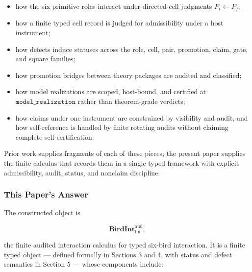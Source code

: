 \documentclass[11pt]{article}
\providecommand{\tightlist}{}
\theoremstyle{definition}
\begin{document}
\begin{itemize}
\tightlist
\item
  how the six primitive roles interact under directed-cell judgments \(P_{i}\leftarrow P_{j}\);
\item
  how a finite typed cell record is judged for admissibility under a host instrument;
\item
  how defects induce statuses across the role, cell, pair, promotion, claim, gate, and square families;
\item
  how promotion bridges between theory packages are audited and classified;
\item
  how model realizations are scoped, host-bound, and certified at \(\texttt{model\_realization}\) rather than theorem-grade verdicts;
\item
  how claims under one instrument are constrained by visibility and audit, and how self-reference is handled by finite rotating audits without claiming complete self-certification.
\end{itemize}

Prior work supplies fragments of each of these pieces; the present paper supplies the finite calculus that records them in a single typed framework with explicit admissibility, audit, status, and nonclaim discipline.

\subsubsection{This Paper's Answer}

The constructed object is

\[
\mathbf{BirdInt}^{\mathrm{aud}}_{\mathrm{fin}},
\]

the finite audited interaction calculus for typed six-bird interaction. It is a finite typed object --- defined formally in Sections 3 and 4, with status and defect semantics in Section 5 --- whose components include:
\end{document}
